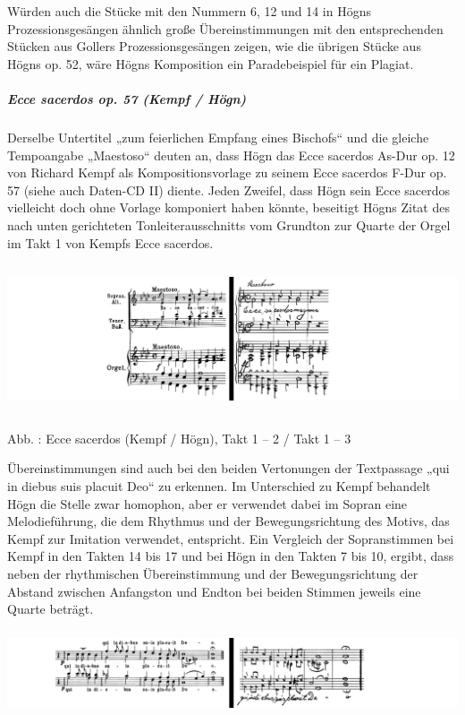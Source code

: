 \documentclass[a4paper]{article}
\newcounter{Abb}
\renewcommand\theAbb{\arabic{Abb}}
\begin{document}
Würden auch die Stücke mit den Nummern 6, 12 und 14 in Högns
Prozessionsgesängen ähnlich große Übereinstimmungen mit den
entsprechenden Stücken aus Gollers Prozessionsgesängen zeigen, wie die
übrigen Stücke aus Högns op. 52, wäre Högns Komposition ein
Paradebeispiel für ein Plagiat.

\subparagraph[Ecce sacerdos op. 57 (Kempf / Högn)]{Ecce sacerdos op. 57
(Kempf / Högn)}
Derselbe Untertitel „zum feierlichen Empfang eines Bischofs“ und die
gleiche Tempoangabe „Maestoso“ deuten an, dass Högn das Ecce sacerdos
As-Dur op. 12 von Richard Kempf als Kompositionsvorlage zu seinem Ecce
sacerdos F-Dur op. 57 (siehe auch Daten-CD II) diente. Jeden Zweifel,
dass Högn sein Ecce sacerdos vielleicht doch ohne Vorlage komponiert
haben könnte, beseitigt Högns Zitat des nach unten gerichteten
Tonleiterausschnitts vom Grundton zur Quarte der Orgel im Takt 1 von
Kempfs Ecce sacerdos.


\includegraphics[width=15.977cm,height=4.394cm]{pictures/zulassungsarbeit-img085.png}


Abb. \stepcounter{Abb}{\theAbb}: Ecce sacerdos (Kempf / Högn), Takt 1 –
2  / Takt 1 – 3

Übereinstimmungen sind auch bei den beiden Vertonungen der Textpassage
„qui in diebus suis placuit Deo“ zu erkennen. Im Unterschied zu Kempf
behandelt Högn die Stelle zwar homophon, aber er verwendet dabei im
Sopran eine Melodieführung, die dem Rhythmus und der Bewegungsrichtung
des Motivs, das Kempf zur Imitation verwendet, entspricht. Ein
Vergleich der Sopranstimmen bei Kempf in den Takten 14 bis 17 und bei
Högn in den Takten 7 bis 10, ergibt, dass neben der rhythmischen
Übereinstimmung und der Bewegungsrichtung der Abstand zwischen
Anfangston und Endton bei beiden Stimmen jeweils eine Quarte beträgt.


\includegraphics[width=15.977cm,height=2.499cm]{pictures/zulassungsarbeit-img086.png}
\end{document}
